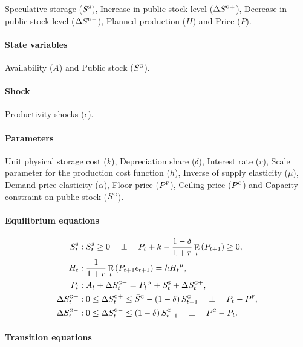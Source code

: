 \documentclass[11pt,fleqn]{article}
\DeclareMathOperator{\E}{E}
\newcommand{\Ss}{S^{\textsc{s}}}
\newcommand{\Sg}{S^{\textsc{g}}}
\newcommand{\PF}{P^{\textsc{f}}}
\newcommand{\Sgb}{\bar{S}^{\textsc{g}}}
\newcommand{\PC}{P^{\textsc{c}}}
\newcommand{\CP}{\quad \perp \quad}
\newcommand{\dSp}[1]{\Delta S^{\textsc{g}+}_{#1}}
\newcommand{\dSm}[1]{\Delta S^{\textsc{g}-}_{#1}}
\begin{document}
Speculative storage ($\Ss$), Increase in public stock level ($\dSp{}$), Decrease in
public stock level ($\dSm{}$), Planned production ($H$) and Price ($P$).

\paragraph{State variables}
\label{sec:state-variable}

Availability ($A$) and Public stock ($\Sg$).

\paragraph{Shock}
\label{sec:shock}

Productivity shocks ($\epsilon$).

\paragraph{Parameters}
\label{sec:parameters}

Unit physical storage cost ($k$), Depreciation share ($\delta$), Interest rate
($r$), Scale parameter for the production cost function ($h$), Inverse of supply
elasticity ($\mu$), Demand price elasticity ($\alpha$), Floor price ($\PF$),
Ceiling price ($\PC$) and Capacity constraint on public stock ($\Sgb$).

\paragraph{Equilibrium equations}
\label{sec:equil-equat}

\begin{align}
  \Ss_{t}&: \Ss_{t}\ge 0 \CP P_{t}+k-\frac{1-\delta}{1+r}\E_{t}\left(P_{t+1}\right)\ge 0,\\
  H_{t}&: \frac{1}{1+r}\E_{t}\left(P_{t+1}\epsilon_{t+1}\right)=h {H_{t}}^{\mu},\\
  P_{t}&: A_{t}+\dSm{t}={P_{t}}^{\alpha}+\Ss_{t}+\dSp{t},\\
  \dSp{t}&:0\le\dSp{t}\le\Sgb-\left(1-\delta\right)\Sg_{t-1} \CP P_{t}-\PF,\\
  \dSm{t}&:0\le\dSm{t}\le\left(1-\delta\right)\Sg_{t-1} \CP \PC-P_{t}.
\end{align}

\paragraph{Transition equations}
\label{sec:transition-equation}
\end{document}

